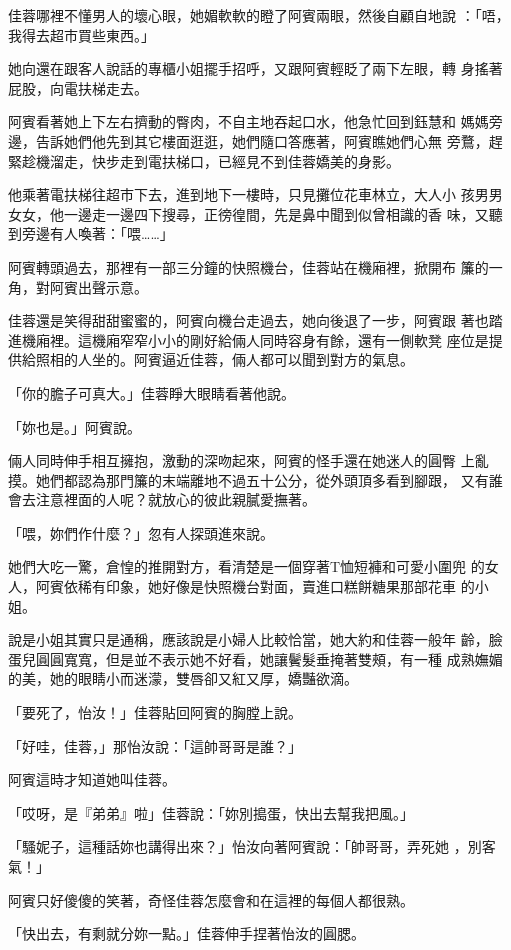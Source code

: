 佳蓉哪裡不懂男人的壞心眼，她媚軟軟的瞪了阿賓兩眼，然後自顧自地說
：「唔，我得去超市買些東西。」

她向還在跟客人說話的專櫃小姐擺手招呼，又跟阿賓輕眨了兩下左眼，轉
身搖著屁股，向電扶梯走去。

阿賓看著她上下左右擠動的臀肉，不自主地吞起口水，他急忙回到鈺慧和
媽媽旁邊，告訴她們他先到其它樓面逛逛，她們隨口答應著，阿賓瞧她們心無
旁鶩，趕緊趁機溜走，快步走到電扶梯口，已經見不到佳蓉嬌美的身影。

他乘著電扶梯往超市下去，進到地下一樓時，只見攤位花車林立，大人小
孩男男女女，他一邊走一邊四下搜尋，正徬徨間，先是鼻中聞到似曾相識的香
味，又聽到旁邊有人喚著：「喂……」

阿賓轉頭過去，那裡有一部三分鐘的快照機台，佳蓉站在機廂裡，掀開布
簾的一角，對阿賓出聲示意。

佳蓉還是笑得甜甜蜜蜜的，阿賓向機台走過去，她向後退了一步，阿賓跟
著也踏進機廂裡。這機廂窄窄小小的剛好給倆人同時容身有餘，還有一側軟凳
座位是提供給照相的人坐的。阿賓逼近佳蓉，倆人都可以聞到對方的氣息。

「你的膽子可真大。」佳蓉睜大眼睛看著他說。

「妳也是。」阿賓說。

倆人同時伸手相互擁抱，激動的深吻起來，阿賓的怪手還在她迷人的圓臀
上亂摸。她們都認為那門簾的末端離地不過五十公分，從外頭頂多看到腳跟，
又有誰會去注意裡面的人呢？就放心的彼此親膩愛撫著。

「喂，妳們作什麼？」忽有人探頭進來說。

她們大吃一驚，倉惶的推開對方，看清楚是一個穿著T恤短褲和可愛小圍兜
的女人，阿賓依稀有印象，她好像是快照機台對面，賣進口糕餅糖果那部花車
的小姐。

說是小姐其實只是通稱，應該說是小婦人比較恰當，她大約和佳蓉一般年
齡，臉蛋兒圓圓寬寬，但是並不表示她不好看，她讓鬢髮垂掩著雙頰，有一種
成熟嫵媚的美，她的眼睛小而迷濛，雙唇卻又紅又厚，嬌豔欲滴。

「要死了，怡汝！」佳蓉貼回阿賓的胸膛上說。

「好哇，佳蓉，」那怡汝說：「這帥哥哥是誰？」

阿賓這時才知道她叫佳蓉。

「哎呀，是『弟弟』啦」佳蓉說：「妳別搗蛋，快出去幫我把風。」

「騷妮子，這種話妳也講得出來？」怡汝向著阿賓說：「帥哥哥，弄死她
，別客氣！」

阿賓只好傻傻的笑著，奇怪佳蓉怎麼會和在這裡的每個人都很熟。

「快出去，有剩就分妳一點。」佳蓉伸手捏著怡汝的圓腮。

